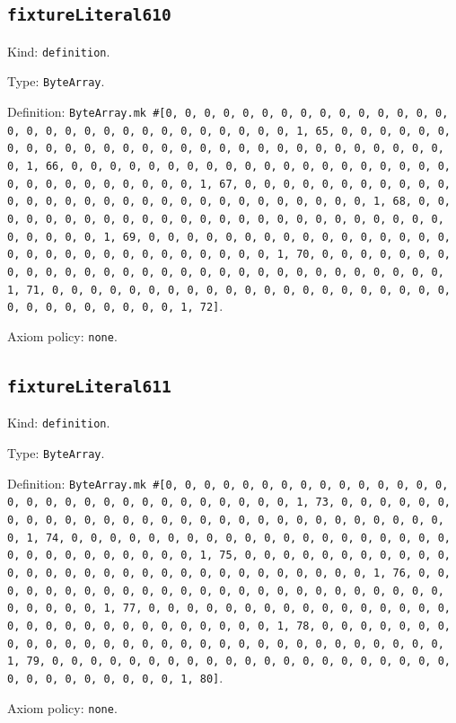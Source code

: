 \documentclass[11pt]{article}
\begin{document}
\subsection*{\texttt{fixtureLiteral610}}
\noindent Kind: \texttt{definition}.\par
\noindent Type: \texttt{ByteArray}.\par
\noindent Definition: \texttt{ByteArray.mk \#[0, 0, 0, 0, 0, 0, 0, 0, 0, 0, 0, 0, 0, 0, 0, 0, 0, 0, 0, 0, 0, 0, 0, 0, 0, 0, 0, 0, 0, 0, 1, 65, 0, 0, 0, 0, 0, 0, 0, 0, 0, 0, 0, 0, 0, 0, 0, 0, 0, 0, 0, 0, 0, 0, 0, 0, 0, 0, 0, 0, 0, 0, 1, 66, 0, 0, 0, 0, 0, 0, 0, 0, 0, 0, 0, 0, 0, 0, 0, 0, 0, 0, 0, 0, 0, 0, 0, 0, 0, 0, 0, 0, 0, 0, 1, 67, 0, 0, 0, 0, 0, 0, 0, 0, 0, 0, 0, 0, 0, 0, 0, 0, 0, 0, 0, 0, 0, 0, 0, 0, 0, 0, 0, 0, 0, 0, 1, 68, 0, 0, 0, 0, 0, 0, 0, 0, 0, 0, 0, 0, 0, 0, 0, 0, 0, 0, 0, 0, 0, 0, 0, 0, 0, 0, 0, 0, 0, 0, 1, 69, 0, 0, 0, 0, 0, 0, 0, 0, 0, 0, 0, 0, 0, 0, 0, 0, 0, 0, 0, 0, 0, 0, 0, 0, 0, 0, 0, 0, 0, 0, 1, 70, 0, 0, 0, 0, 0, 0, 0, 0, 0, 0, 0, 0, 0, 0, 0, 0, 0, 0, 0, 0, 0, 0, 0, 0, 0, 0, 0, 0, 0, 0, 1, 71, 0, 0, 0, 0, 0, 0, 0, 0, 0, 0, 0, 0, 0, 0, 0, 0, 0, 0, 0, 0, 0, 0, 0, 0, 0, 0, 0, 0, 0, 0, 1, 72]}.\par
\noindent Axiom policy: \texttt{none}.\par
\subsection*{\texttt{fixtureLiteral611}}
\noindent Kind: \texttt{definition}.\par
\noindent Type: \texttt{ByteArray}.\par
\noindent Definition: \texttt{ByteArray.mk \#[0, 0, 0, 0, 0, 0, 0, 0, 0, 0, 0, 0, 0, 0, 0, 0, 0, 0, 0, 0, 0, 0, 0, 0, 0, 0, 0, 0, 0, 0, 1, 73, 0, 0, 0, 0, 0, 0, 0, 0, 0, 0, 0, 0, 0, 0, 0, 0, 0, 0, 0, 0, 0, 0, 0, 0, 0, 0, 0, 0, 0, 0, 1, 74, 0, 0, 0, 0, 0, 0, 0, 0, 0, 0, 0, 0, 0, 0, 0, 0, 0, 0, 0, 0, 0, 0, 0, 0, 0, 0, 0, 0, 0, 0, 1, 75, 0, 0, 0, 0, 0, 0, 0, 0, 0, 0, 0, 0, 0, 0, 0, 0, 0, 0, 0, 0, 0, 0, 0, 0, 0, 0, 0, 0, 0, 0, 1, 76, 0, 0, 0, 0, 0, 0, 0, 0, 0, 0, 0, 0, 0, 0, 0, 0, 0, 0, 0, 0, 0, 0, 0, 0, 0, 0, 0, 0, 0, 0, 1, 77, 0, 0, 0, 0, 0, 0, 0, 0, 0, 0, 0, 0, 0, 0, 0, 0, 0, 0, 0, 0, 0, 0, 0, 0, 0, 0, 0, 0, 0, 0, 1, 78, 0, 0, 0, 0, 0, 0, 0, 0, 0, 0, 0, 0, 0, 0, 0, 0, 0, 0, 0, 0, 0, 0, 0, 0, 0, 0, 0, 0, 0, 0, 1, 79, 0, 0, 0, 0, 0, 0, 0, 0, 0, 0, 0, 0, 0, 0, 0, 0, 0, 0, 0, 0, 0, 0, 0, 0, 0, 0, 0, 0, 0, 0, 1, 80]}.\par
\noindent Axiom policy: \texttt{none}.\par
\end{document}
